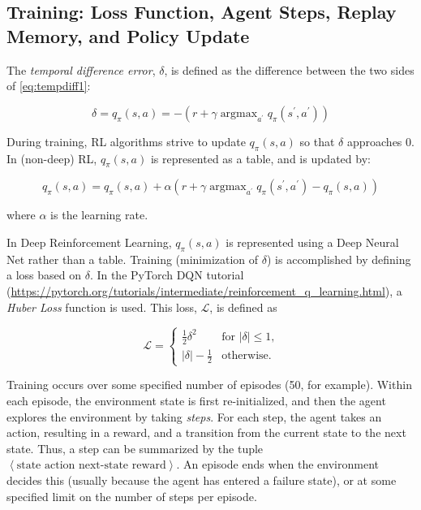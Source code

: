 \documentclass[acmlarge,screen]{acmart}
\DeclareMathOperator*{\argmax}{argmax}
\begin{document}
\subsection{Training: Loss Function, Agent Steps, Replay Memory, and Policy Update}


The \textit{temporal difference error}, $\delta$, is defined as the difference between the two sides of \ref{eq:tempdiff1}:

\begin{equation} \label{eq:tempdiff1}
 \delta =  q_\pi (s,a) = - \left( r + \gamma \argmax_{a^\prime} q_\pi (s^\prime, a^\prime) \right)
\end{equation}

During training, RL algorithms strive to update $q_\pi (s,a)$ so that $\delta$ approaches 0.
In (non-deep) RL, $q_\pi (s,a)$ is represented as a table, and is updated by:

\begin{equation} \label{eq:qupdate}
 q_\pi (s,a) = q_\pi (s,a) + \alpha \left( r + \gamma \argmax_{a^\prime} q_\pi (s^\prime, a^\prime) - q_\pi (s,a) \right)
\end{equation}

\noindent where $\alpha$ is the learning rate.

In Deep Reinforcement Learning, $q_\pi (s,a)$ is represented using a Deep Neural Net rather than a table.
Training (minimization of $\delta$) is accomplished by defining a loss based on $\delta$.
In the PyTorch DQN tutorial (\url{https://pytorch.org/tutorials/intermediate/reinforcement\_q\_learning.html}),
a \textit{Huber Loss} function is used.
This loss, $\mathcal{L}$, is defined as 


\begin{equation}  \label{eq:huberloss}
  \mathcal{L} =
    \begin{cases}
      \frac{1}{2} \delta^2 & \text{for $\lvert \delta \rvert \leq 1$,}\\
      \lvert \delta \rvert - \frac{1}{2} & \text{otherwise.}
    \end{cases}       
\end{equation}

Training occurs over some specified number of episodes (50, for example).
Within each episode, the environment state is first re-initialized, and then the agent explores the environment by taking
\textit{steps}.
For each step, the agent takes an action, resulting in a reward, and a transition from the current state to the next state.
Thus, a step can be summarized by the tuple $\left< \text{state action next-state reward} \right>$.
An episode ends when the environment decides this (usually because the agent has entered a failure state), 
or at some specified limit on the number of steps per episode.
\end{document}

